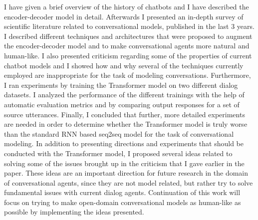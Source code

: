 \documentclass[12pt]{article}
\begin{document}
I have given a brief overview of the history of chatbots and I have described the encoder-decoder model in detail. Afterwards I presented an in-depth survey of scientific literature related to conversational models, published in the last 3 years. I described different techniques and architectures that were proposed to augment the encoder-decoder model and to make conversational agents more natural and human-like. I also presented criticism regarding some of the properties of current chatbot models and I showed how and why several of the techniques currently employed are inappropriate for the task of modeling conversations. Furthermore, I ran experiments by training the Transformer model on two different dialog datasets. I analyzed the performance of the different trainings with the help of automatic evaluation metrics and by comparing output responses for a set of source utterances. Finally, I concluded that further, more detailed experiments are needed in order to determine whether the Transformer model is truly worse than the standard RNN based seq2seq model for the task of conversational modeling. In addition to presenting directions and experiments that should be conducted with the Transformer model, I proposed several ideas related to solving some of the issues brought up in the criticism that I gave earlier in the paper. These ideas are an important direction for future research in the domain of conversational agents, since they are not model related, but rather try to solve fundamental issues with current dialog agents. Continuation of this work will focus on trying to make open-domain conversational models as human-like as possible by implementing the ideas presented.



\newpage
\end{document}
